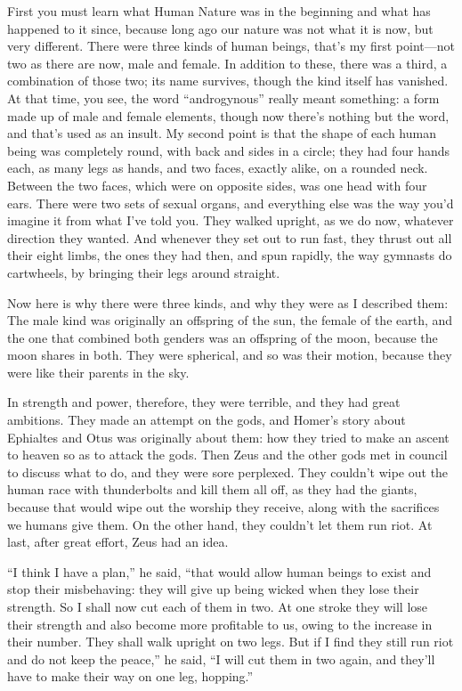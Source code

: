 First you must learn what Human Nature was in the beginning and what has
happened to it since, because long ago our nature was not what it is
now, but very different. There were three kinds of human beings, that's
my first point---not two as there are now, male and female. In 
addition to these, there was a third, a combination of those two; its
name survives, though the kind itself has vanished. At that time, you
see, the word “androgynous” really meant something: a form made up of
male and female elements, though now there's nothing but the word, and
that's used as an insult. My second point is that the shape of each
human being was completely round, with back and sides in a circle; they
had four hands each, as many legs as hands, and two faces, exactly
alike, on a rounded  neck. Between the two faces, which
were on opposite sides, was one head with four ears. There were two sets
of sexual organs, and everything else was the way you'd imagine it from
what I've told you. They walked upright, as we do now, whatever
direction they wanted. And whenever they set out to run fast, they
thrust out all their eight limbs, the ones they had then, and spun
rapidly, the way gymnasts do cartwheels, by bringing their legs around
straight.

Now here is why there were three kinds, and why they were as I 
described them: The male kind was originally an offspring of the sun,
the female of the earth, and the one that combined both genders was an
offspring of the moon, because the moon shares in both. They were
spherical, and so was their motion, because they were like their parents
in the sky.

In strength and power, therefore, they were terrible, and they had great
ambitions. They made an attempt on the gods, and Homer's story about
Ephialtes and Otus was originally about them: how they tried to make an
ascent to heaven so as to attack the
gods. Then Zeus and
the other gods  met in council to discuss what to do, and they
were sore perplexed. They couldn't wipe out the human race with
thunderbolts and kill them all off, as they had the giants, because that
would wipe out the worship they receive, along with the sacrifices we
humans give them. On the other hand, they couldn't let them run riot. At
last, after great effort, Zeus had an idea.

“I think I have a plan,” he said, “that would allow human beings to
exist and stop their misbehaving: they will give up being wicked when
 they lose their strength. So I shall now cut each of them in
two. At one stroke they will lose their strength and also become more
profitable to us, owing to the increase in their number. They shall walk
upright on two legs. But if I find they still run riot and do not keep
the peace,” he said, “I will cut them in two again, and they'll have to
make their way on one leg, hopping.”

